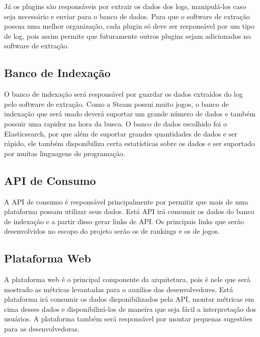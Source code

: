 Já os plugins são responsáveis por extrair os dados dos logs, manipulá-los caso seja necessário e enviar para o banco de dados. Para que o software de extração possua uma melhor organização, cada plugin só deve ser responsável por um tipo de log, pois assim permite que futuramente outros plugins sejam adicionados no software de extração.
\subsection{Banco de Indexação}
O banco de indexação será responsável por guardar os dados extraídos do log pelo software de extração. Como a Steam possui muito jogos, o banco de indexação que será usado deverá suportar um grande número de dados e também possuir uma rapidez na hora da busca. O banco de dados escolhido foi o Elasticsearch, por que além de suportar grandes quantidades de dados e ser rápido, ele também disponibiliza certa estatísticas sobre os dados e ser suportado por muitas linguagens de programação.
\subsection{API de Consumo}
A API de consumo é responsável principalmente por permitir que mais de uma plataforma possam utilizar seus dados. Está API irá consumir os dados do banco de indexação e a partir disso gerar links de API. Os principais links que serão desenvolvidos no escopo do projeto serão os de rankings e os de jogos.
\subsection{Plataforma Web}
A plataforma web é o principal componente da arquitetura, pois é nele que será mostrado as métricas levantadas para o auxilios das desenvolvedores. Está plataforma irá consumir os dados disponibilizados pela API, montar métricas em cima desses dados e disponibilizá-los de maneira que seja fácil a interpretação dos usuários. A plataforma também será responsável por montar pequenas sugestões para as desenvolvedoras.

